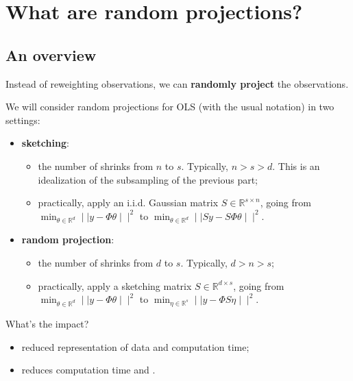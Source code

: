 \documentclass[
11pt,notheorems,hyperref={pdfauthor=whatever}
]{beamer}
\begin{document}
\section{What are random projections?}
\subsection{An overview}

\begin{frame}
    Instead of reweighting observations, we can \alert{\textbf{randomly project}} the observations.

    \vspace*{0.5em}
    We will consider random projections for OLS (with the usual notation) in two settings:
    \begin{itemize}
        \item \alert{\textbf{sketching}}:
        \begin{itemize}
            \item the number of  shrinks from \(n\) to \(s\). Typically, \(n > s > d\). This is an idealization of the subsampling of the previous part;
            \item practically, apply an i.i.d. Gaussian matrix \(S \in \mathbb{R}^{s \times n}\), going from \(\min_{\theta\in\mathbb{R}^d}\mid\mid y-\Phi\theta\mid\mid^2\) to \(\min_{\theta\in\mathbb{R}^d}\mid\mid Sy-S\Phi\theta\mid\mid^2\).
        \end{itemize}
        
        \vspace{0.25em}
        \item \alert{\textbf{random projection}}:
        \begin{itemize}
            \item the number of  shrinks from \(d\) to \(s\). Typically, \(d > n > s\);
            \item practically, apply a sketching matrix \(S \in \mathbb{R}^{d \times s}\), going from \(\min_{\theta\in\mathbb{R}^d}\mid\mid y-\Phi\theta\mid\mid^2\) to \(\min_{\eta\in\mathbb{R}^s}\mid\mid y-\Phi S\eta\mid\mid^2\).
        \end{itemize}
    \end{itemize}

    What's the impact?
    \begin{itemize}
        \item {} reduced representation of data and computation time;
        \item {} reduces computation time and .
    \end{itemize}
\end{frame}
\end{document}
